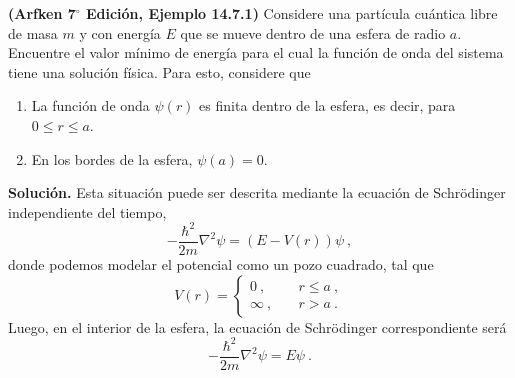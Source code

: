 
\begin{ejemplo}
    \textbf{(Arfken 7$^{\boldsymbol{\circ}}$ Edición, Ejemplo 14.7.1)} Considere una partícula cuántica libre de masa $m$ y con energía $E$ que se mueve dentro de una esfera de radio $a$. Encuentre el valor mínimo de energía para el cual la función de onda del sistema tiene una solución física. Para esto, considere que
    \begin{enumerate}
        \item La función de onda $\psi(r)$ es finita dentro de la esfera, es decir, para $0 \leq r \leq a$.
        \item En los bordes de la esfera, $\psi(a) = 0$.
    \end{enumerate} 

    \textbf{Solución.} Esta situación puede ser descrita mediante la ecuación de Schrödinger independiente del tiempo,
    \begin{equation*}
        - \frac{\hbar^2}{2m} \nabla^2 \psi = (E - V(r)) \psi \ ,
    \end{equation*}
    donde podemos modelar el potencial como un pozo cuadrado, tal que
    \begin{equation*}
        V(r) = \left\{ \begin{array}{cc}
            0 \ , & \quad r \leq a \ , \\
            \infty \ , & \quad r > a \ .
        \end{array} \right.
    \end{equation*}
    Luego, en el interior de la esfera, la ecuación de Schrödinger correspondiente será
    \begin{equation*}
        - \frac{\hbar^2}{2m} \nabla^2 \psi = E \psi \ .
    \end{equation*}
    

\end{ejemplo}
